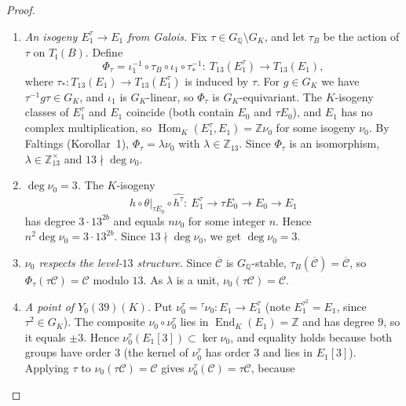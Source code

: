 \documentclass[11pt]{article}
\newcommand{\Q}{\mathbb Q}
\newcommand{\Z}{\mathbb Z}
\DeclareMathOperator{\End}{End}
\DeclareMathOperator{\Hom}{Hom}
\begin{document}
\begin{proof}
\begin{enumerate}
subgroup \(\Sigma\). Put \(E_1=E_0/\Sigma\) and let \(h:E_0\to E_1\) be
the quotient, a \(K\)-isogeny of degree \(13^b\) for some \(b\ge0\).
Then \(\iota\) and \(h\) give an isomorphism of \(G_K\)-modules
\(\iota_1:T_{13}(E_1)\to T_{\mathfrak l}(B)\). Put
\(\mathcal C=\iota_1^{-1}(\overline{\mathcal C})\subset E_1[13]\), a
\(G_K\)-stable subgroup of order \(13\). The curve \(E_1\) has no
complex multiplication.
\item \emph{An isogeny \(E_1^\tau\to E_1\) from Galois.} Fix
\(\tau\in G_{\Q}\setminus G_K\), and let \(\tau_B\) be the action of
\(\tau\) on \(T_{\mathfrak l}(B)\). Define
\[
\Phi_\tau=\iota_1^{-1}\circ\tau_B\circ\iota_1\circ\tau_*^{-1}:\
T_{13}(E_1^\tau)\longrightarrow T_{13}(E_1),
\]
where \(\tau_*:T_{13}(E_1)\to T_{13}(E_1^\tau)\) is induced by
\(\tau\). For \(g\in G_K\) we have \(\tau^{-1}g\tau\in G_K\), and
\(\iota_1\) is \(G_K\)-linear, so \(\Phi_\tau\) is
\(G_K\)-equivariant. The \(K\)-isogeny classes of \(E_1^\tau\) and
\(E_1\) coincide (both contain \(E_0\) and \(\tau E_0\)), and \(E_1\)
has no complex multiplication, so \(\Hom_K(E_1^\tau,E_1)=\Z\nu_0\) for
some isogeny \(\nu_0\). By Faltings (Korollar~1),
\(\Phi_\tau=\lambda\nu_0\) with \(\lambda\in\Z_{13}\). Since
\(\Phi_\tau\) is an isomorphism, \(\lambda\in\Z_{13}^\times\) and
\(13\nmid\deg\nu_0\).
\item \emph{\(\deg\nu_0=3\).} The \(K\)-isogeny
\[
h\circ\theta|_{\tau E_0}\circ\widehat{h^\tau}:\
E_1^\tau\longrightarrow\tau E_0\longrightarrow E_0\longrightarrow E_1
\]
has degree \(3\cdot13^{2b}\) and equals \(n\nu_0\) for some integer
\(n\). Hence \(n^2\deg\nu_0=3\cdot13^{2b}\). Since
\(13\nmid\deg\nu_0\), we get \(\deg\nu_0=3\).
\item \emph{\(\nu_0\) respects the level-\(13\) structure.} Since
\(\overline{\mathcal C}\) is \(G_{\Q}\)-stable,
\(\tau_B(\overline{\mathcal C})=\overline{\mathcal C}\), so
\(\Phi_\tau(\tau\mathcal C)=\mathcal C\) modulo \(13\). As \(\lambda\)
is a unit, \(\nu_0(\tau\mathcal C)=\mathcal C\).
\item \emph{A point of \(Y_0(39)(K)\).} Put
\(\nu_0^\tau={}^\tau\nu_0:E_1\to E_1^\tau\) (note
\(E_1^{\tau^2}=E_1\), since \(\tau^2\in G_K\)). The composite
\(\nu_0\circ\nu_0^\tau\) lies in \(\End_K(E_1)=\Z\) and has degree
\(9\), so it equals \(\pm3\). Hence
\(\nu_0^\tau(E_1[3])\subset\ker\nu_0\), and equality holds because both
groups have order \(3\) (the kernel of \(\nu_0^\tau\) has order \(3\)
and lies in \(E_1[3]\)). Applying \(\tau\) to
\(\nu_0(\tau\mathcal C)=\mathcal C\) gives
\(\nu_0^\tau(\mathcal C)=\tau\mathcal C\), because

\end{enumerate}
\end{proof}
\end{document}
